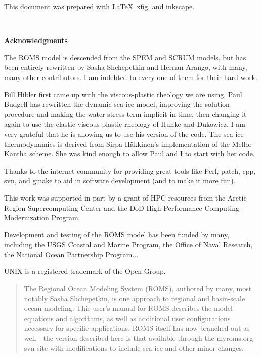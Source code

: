 \setcounter{page}{0}
This document was prepared with \LaTeX\, xfig, and inkscape.

\mbox{  }
\begin{center}
\bf \LARGE Acknowledgments
\end{center}

The ROMS model is descended from the SPEM and SCRUM models, but has
been entirely rewritten by Sasha Shchepetkin and Hernan Arango, with
many, many other contributors. I am indebted to every one of them
for their hard work.

Bill Hibler first came up with the viscous-plastic rheology we are
using. Paul Budgell has rewritten the dynamic sea-ice model, improving
the solution procedure and making the water-stress term implicit in time,
then changing it again to use the elastic-viscous-plastic rheology of
Hunke and Dukowicz. I am very grateful that he is allowing us to use
his version of the code. The sea-ice thermodynamics is derived from
Sirpa H\"akkinen's implementation of the Mellor-Kantha scheme. She was
kind enough to allow Paul and I to start with her code.

Thanks to the internet community for providing great tools like Perl,
patch, cpp, svn, and gmake to aid in software development (and to make
it more fun).

This work was supported in part by a grant of HPC resources from the
Arctic Region Supercomputing Center and the DoD High Performance
Computing Modernization Program.

Development and testing of the ROMS model has been funded by many,
including the USGS Coastal and Marine Program, the Office of Naval
Research, the National Ocean Partnership Program...

\vspace{\fill}
UNIX is a registered trademark of the Open Group.


\vfil\break
\begin{abstract}
The Regional Ocean Modeling System (ROMS), authored by many, most
notably Sasha Shchepetkin, is one approach to regional and basin-scale ocean
modeling. This user's manual for ROMS describes the model equations
and algorithms, as well as additional user configurations necessary
for specific applications. ROMS itself has now branched out as
well - the version described here is that available through the
myroms.org svn site with modifications to include sea ice and other
minor changes.

\end{abstract}
